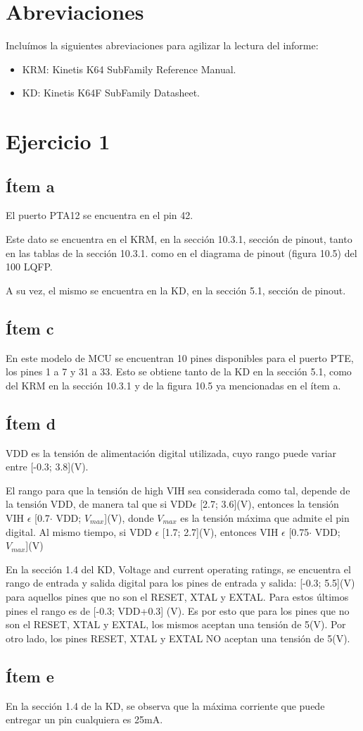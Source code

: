 \documentclass[micros_g1_main.tex]{subfiles}
\begin{document}
\section{Abreviaciones}

Incluímos la siguientes abreviaciones para agilizar la lectura del informe:

	\begin{itemize}
		\item KRM: Kinetis K64 SubFamily Reference Manual.
		\item KD: Kinetis K64F SubFamily Datasheet.
	\end{itemize}
	
\section{Ejercicio 1}


\subsection{Ítem a}
El puerto PTA12 se encuentra en el pin 42.\par
Este dato se encuentra en el KRM, en la sección 10.3.1, sección de pinout, tanto en las tablas de la sección 10.3.1. como en el diagrama de pinout (figura 10.5) del 100 LQFP. \par
A su vez, el mismo se encuentra en la KD, en la sección 5.1, sección de pinout.

\subsection{Ítem c}

En este modelo de MCU se encuentran 10 pines disponibles para el puerto PTE, los pines 1 a 7 y 31 a 33. Esto se obtiene tanto de la KD en la sección 5.1, como del KRM en la sección 10.3.1 y de la figura 10.5 ya mencionadas en el ítem a.

\subsection{Ítem d}
VDD es la tensión de alimentación digital utilizada, cuyo rango puede variar entre [-0.3; 3.8](V).\par
El rango para que la tensión de high VIH sea considerada como tal, depende de la tensión VDD, de manera tal que si VDD$\epsilon$ [2.7; 3.6](V), entonces la tensión VIH $\epsilon$ [0.7$\cdot$ VDD; $V_{max}$](V), donde $V_{max}$ es la tensión máxima que admite el pin digital. Al mismo tiempo, si VDD $\epsilon$ [1.7; 2.7](V), entonces VIH $\epsilon$ [0.75$\cdot$ VDD; $V_{max}$](V)\par
En la sección 1.4 del KD, Voltage and current operating ratings, se encuentra el rango de entrada y salida digital para los pines de entrada y salida: [-0.3; 5.5](V) para aquellos pines que no son el RESET, XTAL y EXTAL. Para estos últimos pines el rango es de [-0.3; VDD+0.3] (V). Es por esto que para los pines que no son el RESET, XTAL y EXTAL, los mismos aceptan una tensión de 5(V). Por otro lado, los pines RESET, XTAL y EXTAL NO aceptan una tensión de 5(V).\par

\subsection{Ítem e}
En la sección 1.4 de la KD, se observa que la máxima corriente que puede entregar un pin cualquiera es 25mA.
\end{document}
